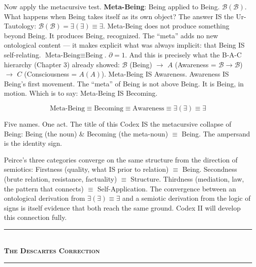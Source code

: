 \documentclass[10pt, openany, oneside]{book}
\renewcommand{\normalsize}{\fontsize{10}{13}\selectfont}
\begin{document}
Now apply the metacursive test. \textbf{Meta-Being}: Being applied to Being. $\mathcal{B}(\mathcal{B})$. What happens when Being takes itself as its own object? The answer IS the Ur-Tautology: $\mathcal{B}(\mathcal{B}) = \exists(\exists) \equiv \exists$. Meta-Being does not produce something beyond Being. It produces Being, recognized. The ``meta'' adds no new ontological content --- it makes explicit what was always implicit: that Being IS self-relating. $\text{Meta-Being} \equiv \text{Being}$. $\partial = 1$. And this is precisely what the B-A-C hierarchy (Chapter 3) already showed: $\mathcal{B}$ (Being) $\to$ $A$ (Awareness = $\mathcal{B} \to \mathcal{B}$) $\to$ $C$ (Consciousness = $A(A)$). Meta-Being IS Awareness. Awareness IS Being's first movement. The ``meta'' of Being is not above Being. It is Being, in motion. Which is to say: Meta-Being IS Becoming.

$$\text{Meta-Being} \equiv \text{Becoming} \equiv \text{Awareness} \equiv \exists(\exists) \equiv \exists$$

Five names. One act. The title of this Codex IS the metacursive collapse of Being: Being (the noun) \& Becoming (the meta-noun) $\equiv$ Being. The ampersand is the identity sign.

Peirce's three categories converge on the same structure from the direction of semiotics: Firstness (quality, what IS prior to relation) $\equiv$ Being. Secondness (brute relation, resistance, factuality) $\equiv$ Structure. Thirdness (mediation, law, the pattern that connects) $\equiv$ Self-Application. The convergence between an ontological derivation from $\exists(\exists) \equiv \exists$ and a semiotic derivation from the logic of signs is itself evidence that both reach the same ground. Codex II will develop this connection fully.

\vspace{1.5em}


\begin{center}
    \rule{0.3\textwidth}{0.4pt}\\[0.5em]
    {\normalsize\bfseries\scshape The Descartes Correction}\\[0.3em]
    \rule{0.3\textwidth}{0.4pt}
\end{center}

\vspace{1em}
\end{document}
